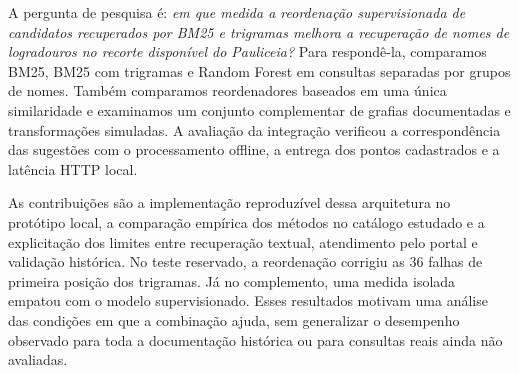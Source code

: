 A pergunta de pesquisa é: \emph{em que medida a reordenação supervisionada de candidatos recuperados por BM25 e trigramas melhora a recuperação de nomes de logradouros no recorte disponível do Pauliceia?} Para respondê-la, comparamos BM25, BM25 com trigramas e Random Forest em consultas separadas por grupos de nomes. Também comparamos reordenadores baseados em uma única similaridade e examinamos um conjunto complementar de grafias documentadas e transformações simuladas. A avaliação da integração verificou a correspondência das sugestões com o processamento offline, a entrega dos pontos cadastrados e a latência HTTP local.

As contribuições são a implementação reproduzível dessa arquitetura no protótipo local, a comparação empírica dos métodos no catálogo estudado e a explicitação dos limites entre recuperação textual, atendimento pelo portal e validação histórica. No teste reservado, a reordenação corrigiu as 36 falhas de primeira posição dos trigramas. Já no complemento, uma medida isolada empatou com o modelo supervisionado. Esses resultados motivam uma análise das condições em que a combinação ajuda, sem generalizar o desempenho observado para toda a documentação histórica ou para consultas reais ainda não avaliadas.
